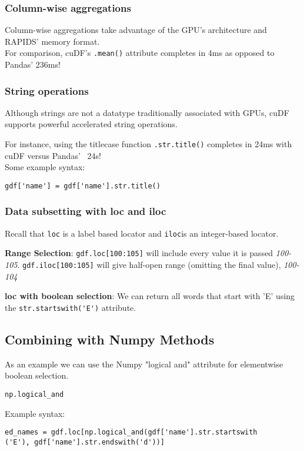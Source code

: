 \documentclass{article}
\begin{document}
\subsubsection{Column-wise aggregations}

Column-wise aggregations take advantage of the GPU's architecture and RAPIDS' memory format. \\

For comparison, cuDF's \verb_.mean()_ attribute completes in 4ms as opposed to Pandas' 236ms!

\subsubsection{String operations}
Although strings are not a datatype traditionally associated with GPUs, cuDF supports powerful accelerated string operations.

For instance, using the titlecase function \verb_.str.title()_ completes in 24ms with cuDF versus Pandas' ~24s! \\

Some example syntax:

\begin{verbatim}
gdf['name'] = gdf['name'].str.title()
\end{verbatim}

\subsubsection{Data subsetting with loc and iloc}
Recall that \verb_loc_ is a label based locator and \verb_iloc_is an integer-based locator.

\textbf{Range Selection}: \verb_gdf.loc[100:105]_ will include every value it is passed \textit{100-105}. \verb_gdf.iloc[100:105]_ will give half-open range (omitting the final value), \textit{100-104}

\textbf{loc with boolean selection}: 
We can return all words that start with 'E' using the \verb_str.startswith('E')_ attribute.

\subsection{Combining with Numpy Methods}
As an example we can use the Numpy "logical and" attribute for elementwise boolean selection.
 

\begin{verbatim}
np.logical_and
\end{verbatim}


Example syntax:

\begin{verbatim}
ed_names = gdf.loc[np.logical_and(gdf['name'].str.startswith
('E'), gdf['name'].str.endswith('d'))]
\end{verbatim}
\end{document}
